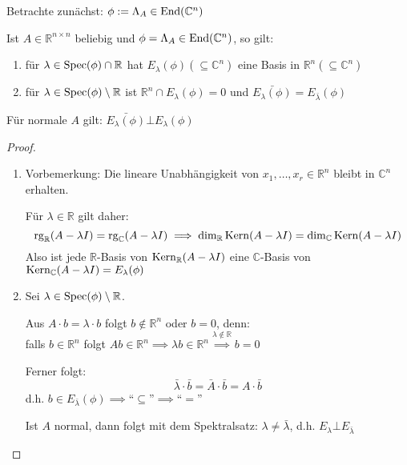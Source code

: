 \documentclass[parskip,a4paper,twoside,DIV15,BCOR12mm]{scrbook}
\begin{document}
Betrachte zunächst: \(\phi:=\Lambda_{A}\in\operatorname{End}(\mathbb{C}^{n})\)
\begin{lemma}
Ist \(A\in\mathbb{R}^{n\times n}\) beliebig und 
\(\phi=\Lambda_{A}\in\operatorname{End}(\mathbb{C}^{n})\), so gilt:
\begin{enumerate}
\item für \(\lambda\in\operatorname{Spec}(\phi)\cap\mathbb{R}\) hat \(E_{\lambda}(\phi)
(\subseteq\mathbb{C}^{n})\) eine Basis in \(\mathbb{R}^{n}(\subseteq\mathbb{C}^{n})\)
\item für \(\lambda\in\operatorname{Spec}(\phi)\setminus\mathbb{R}\) ist 
\(\mathbb{R}^{n}\cap E_{\lambda}(\phi)=0\) und 
\(\bar{E_{\lambda}(\phi)}=E_{\bar{\lambda}}(\phi)\)
\end{enumerate}
Für normale \(A\) gilt: \(\bar{E_{\lambda}(\phi)}\bot E_{\lambda}(\phi)\)
\end{lemma}
\begin{proof}
\begin{enumerate}
\item Vorbemerkung: Die lineare Unabhängigkeit von 
\(x_{1},\ldots,x_{r}\in\mathbb{R}^{n}\) bleibt in \(\mathbb{C}^{n}\) erhalten.

Für \(\lambda\in\mathbb{R}\) gilt daher: 
\[
\operatorname{rg}_{\mathbb{R}}(A-\lambda I)=\operatorname{rg}_{\mathbb{C}}(A-\lambda I)\implies
\dim_{\mathbb{R}}\operatorname{Kern}(A-\lambda I)=\dim_{\mathbb{C}}\operatorname{Kern}(A-\lambda I)
\]
Also ist jede \(\mathbb{R}\)-Basis von \(\operatorname{Kern}_{\mathbb{R}}(A-\lambda I)\) eine
\(\mathbb{C}\)-Basis von \(\operatorname{Kern}_{\mathbb{C}}(A-\lambda I)=E_{\lambda}(\phi)\)
\item Sei \(\lambda\in\operatorname{Spec}(\phi)\setminus\mathbb{R}\).

Aus \(A\cdot b=\lambda\cdot b\) folgt \(b\not\in\mathbb{R}^{n}\) oder \(b=0\),
denn:\\
falls \(b\in\mathbb{R}^{n}\) folgt \(Ab\in\mathbb{R}^{n}\implies\lambda 
    b\in\mathbb{R}^{n}\overset{\lambda\not\in\mathbb{R}}{\implies}b=0\)

Ferner folgt:
\[
\bar{\lambda}\cdot\bar{b}=\bar{A}\cdot\bar{b}=A\cdot\bar{b}
\]
d.h. \(b\in E_{\bar{\lambda}}(\phi)\implies\text{``}\subseteq\text{''}\implies\text{``}=\text{''}\)

Ist \(A\) normal, dann folgt mit dem Spektralsatz: \(\lambda\neq\bar{\lambda}\),
d.h. \(E_{\lambda}\bot E_{\bar{\lambda}}\)
\end{enumerate}
\end{proof}
\end{document}
